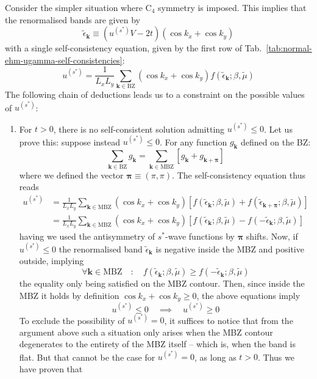 Consider the simpler situation where $\mathrm{C}_4$ symmetry is imposed. This implies that the renormalised bands are given by
\[
	\tilde{\epsilon}_\mathbf{k} \equiv (u^{(s^*)} V - 2t) (\cos k_x + \cos k_y)
\]
with a single self-consistency equation, given by the first row of Tab.~\ref{tab:normal-ehm-ugamma-self-consistencies}:
\[
	u^{(s^*)} = \frac{1}{L_x L_y} \sum_{\mathbf{k}\in\mathrm{BZ}} (\cos k_x + \cos k_y) f(\tilde{\epsilon}_\mathbf{k};\beta,\tilde{\mu})
\]
The following chain of deductions leads us to a constraint on the possible values of $u^{(s^*)}$:
\begin{enumerate}
	\item For $t>0$, there is no self-consistent solution admitting $u^{(s^*)}\le0$. Let us prove this: suppose instead $u^{(s^*)}\le0$. For any function $g_\mathbf{k}$ defined on the BZ:
	\[
	\sum_{\mathbf{k}\in\mathrm{BZ}} g_\mathbf{k} = \sum_{\mathbf{k}\in\mathrm{MBZ}} \left[
	g_\mathbf{k} + g_{\mathbf{k}+\bm{\pi}}
	\right]
	\]
	where we defined the vector $\bm{\pi}\equiv(\pi,\pi)$. The self-consistency equation thus reads
	\begin{align}
		u^{(s^*)} &= \frac{1}{L_x L_y} \sum_{\mathbf{k}\in\mathrm{MBZ}} (\cos k_x + \cos k_y) \left[
		f(\tilde{\epsilon}_\mathbf{k};\beta,\tilde{\mu}) + f(\tilde{\epsilon}_{\mathbf{k}+\bm{\pi}};\beta,\tilde{\mu})
		\right] \nonumber \\
		&= \frac{1}{L_x L_y} \sum_{\mathbf{k}\in\mathrm{MBZ}} (\cos k_x + \cos k_y) \left[
		f(\tilde{\epsilon}_\mathbf{k};\beta,\tilde{\mu}) - f(-\tilde{\epsilon}_\mathbf{k};\beta,\tilde{\mu})
		\right] \label{appeq:normal-us*-constraint-int1}
	\end{align}
	having we used the antisymmetry of $s^*$-wave functions by $\bm{\pi}$ shifts. Now, if $u^{(s^*)}\le0$ the renormalised band $\tilde{\epsilon}_\mathbf{k}$ is negative inside the MBZ and positive outside, implying
	\[
	\forall \mathbf{k} \in \mathrm{MBZ}
	\quad\colon\quad
	f(\tilde{\epsilon}_\mathbf{k};\beta,\tilde{\mu}) \ge f(-\tilde{\epsilon}_\mathbf{k};\beta,\tilde{\mu})
	\]
	the equality only being satisfied on the MBZ contour. Then, since inside the MBZ it holds by definition $\cos k_x + \cos k_y \ge 0$, the above equations imply
	\[
	u^{(s^*)} \le 0 
	\quad\implies\quad
	u^{(s^*)} \ge 0
	\]
	To exclude the possibility of $u^{(s^*)}=0$, it suffices to notice that from the argument above such a situation only arises when the MBZ contour degenerates to the entirety of the MBZ itself -- which is, when the band is flat. But that cannot be the case for $u^{(s^*)} = 0$, as long as $t>0$. Thus we have proven that

\end{enumerate}
